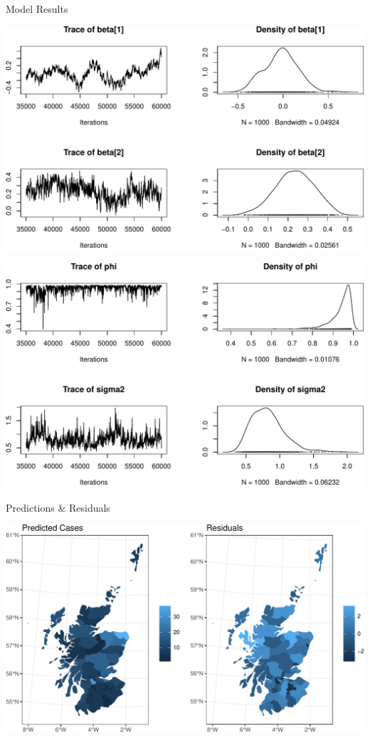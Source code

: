 \documentclass[11pt,ignorenonframetext,]{beamer}
\begin{document}
\begin{frame}{Model Results}

\includegraphics{Lec20_files/figure-beamer/unnamed-chunk-8-1.pdf}

\end{frame}

\begin{frame}{}

\includegraphics{Lec20_files/figure-beamer/unnamed-chunk-9-1.pdf}

\end{frame}

\begin{frame}{Predictions \& Residuals}

\includegraphics{Lec20_files/figure-beamer/unnamed-chunk-10-1.pdf}

\end{frame}
\end{document}
